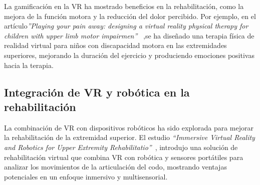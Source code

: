 La gamificación en la VR ha mostrado beneficios en la rehabilitación, como la mejora de la función motora y la reducción del dolor percibido. Por ejemplo, en el artículo\textit{''Playing your pain away: designing a virtual reality physical therapy for children with upper limb motor impairmen''}      ~\cite{vr_kids_pain2023},se ha diseñado una terapia física de realidad virtual para niños con discapacidad motora en las extremidades superiores, mejorando la duración del ejercicio y produciendo emociones positivas hacia la terapia.

\subsection{Integración de VR y robótica en la rehabilitación}

La combinación de VR con dispositivos robóticos ha sido explorada para mejorar la rehabilitación de la extremidad superior. El estudio \textit{``Immersive Virtual Reality and Robotics for Upper Extremity Rehabilitatio''}~\cite{vr_robotics2023}, introdujo una solución de rehabilitación virtual que combina VR con robótica y sensores portátiles para analizar los movimientos de la articulación del codo, mostrando ventajas potenciales en un enfoque inmersivo y multisensorial.